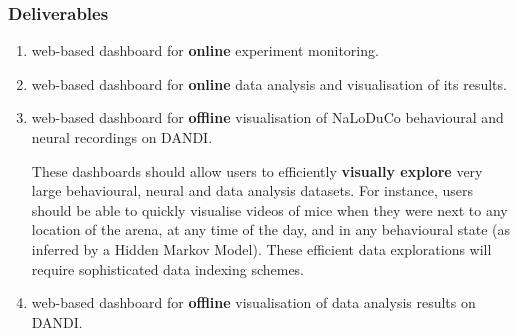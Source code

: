 
\begin{frame}
    \frametitle{Deliverables}

    \begin{enumerate}

        \item web-based dashboard for \textbf{online} experiment monitoring.

        \item web-based dashboard for \textbf{online} data analysis and
        visualisation of its results.

        \item web-based dashboard for \textbf{offline} visualisation of
            NaLoDuCo behavioural and neural recordings on DANDI.

            These dashboards should allow users to efficiently \textbf{visually
            explore} very large behavioural, neural and data analysis datasets.
            For instance, users should be able to quickly visualise videos of
            mice when they were next to any location of the arena, at any time
            of the day, and in any behavioural state (as inferred by a Hidden
            Markov Model). These efficient data explorations will require
            sophisticated data indexing schemes.

        \item web-based dashboard for \textbf{offline} visualisation of data
            analysis results on DANDI.

    \end{enumerate}

\end{frame}

